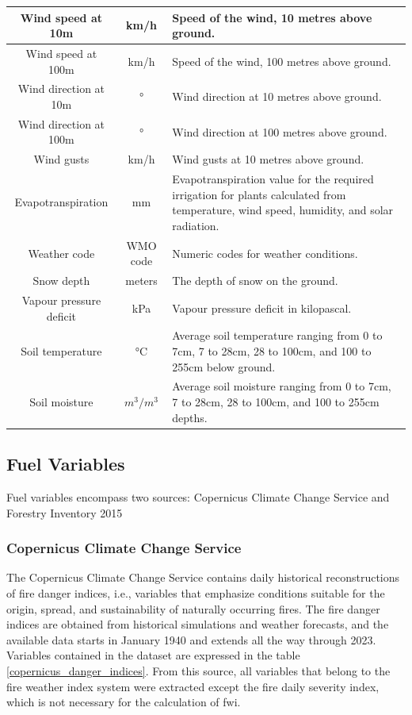 \begin{table}[H]
\begin{tabular}{ccp{10cm}}
		\hline
		Wind speed at 10m & km/h & Speed of the wind, 10 metres above ground.  \\
		\hline
		Wind speed at 100m & km/h & Speed of the wind, 100 metres above ground.  \\
		\hline
		Wind direction at 10m & ° & Wind direction at 10 metres above ground.  \\
		\hline
		Wind direction at 100m & ° & Wind direction at 100 metres above ground.  \\
		\hline
		Wind gusts & km/h & Wind gusts at 10 metres above ground.  \\
		\hline
		Evapotranspiration & mm & Evapotranspiration value for the required irrigation for plants calculated from temperature, wind speed, humidity, and solar radiation. \\
		\hline
		Weather code & WMO code & Numeric codes for weather conditions.  \\
		\hline
		Snow depth & meters & The depth of snow on the ground.  \\
		\hline
		Vapour pressure deficit & kPa & Vapour pressure deficit in kilopascal.\\
		\hline
		Soil temperature & °C & Average soil temperature ranging from 0 to 7cm, 7 to 28cm, 28 to 100cm, and 100 to 255cm below ground.\\
		\hline
		Soil moisture & $m^3/m^3$ & Average soil moisture ranging from 0 to 7cm, 7 to 28cm, 28 to 100cm, and 100 to 255cm depths.\\
		\hline
	\end{tabular}
\end{table}







\subsection{Fuel Variables}
Fuel variables encompass two sources: Copernicus Climate Change Service \cite{CopernicusCDS2019} and Forestry Inventory 2015 \cite{uva2021forestry,https://doi.org/10.15468/dl.zwfmbt}

\subsubsection{Copernicus Climate Change Service \cite{CopernicusCDS2019}}

The Copernicus Climate Change Service contains daily historical reconstructions of fire danger indices, i.e., variables that emphasize conditions suitable for the origin, spread, and sustainability of naturally occurring fires. The fire danger indices are obtained from historical simulations and weather forecasts, and the available data starts in January 1940 and extends all the way through 2023. Variables contained in the dataset are expressed in the table \ref{copernicus_danger_indices}.
From this source, all variables that belong to the fire weather index system were extracted except the fire daily severity index, which is not necessary for the calculation of fwi.

